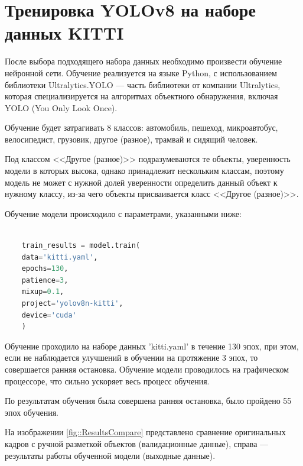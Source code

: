 \chapter {Тренировка YOLOv8 на наборе данных KITTI}

После выбора подходящего набора данных необходимо произвести обучение нейронной 
сети. Обучение реализуется на языке Python, с использованием библиотеки 
Ultralytics.YOLO --- часть библиотеки от компании Ultralytics, которая 
специализируется на алгоритмах объектного обнаружения, включая YOLO (You Only 
Look Once).

Обучение будет затрагивать 8 классов: автомобиль, пешеход, микроавтобус, 
велосипедист, грузовик, другое (разное), трамвай и сидящий человек.

Под классом <<Другое (разное)>> подразумеваются те объекты, уверенность модели
в которых высока, однако принадлежит нескольким классам, поэтому модель не может
с нужной долей уверенности определить данный объект к нужному классу, из-за чего 
объекты присваивается класс <<Другое (разное)>>.

Обучение модели происходило с параметрами, указанными ниже:

\begin{lstlisting}[language=Python]

	train_results = model.train(
    data='kitti.yaml', 
    epochs=130,
    patience=3,
    mixup=0.1,
    project='yolov8n-kitti',
    device='cuda'
	)

\end{lstlisting}

Обучение проходило на наборе данных 'kitti.yaml' в течение 130 эпох, при этом, если
не наблюдается улучшений в обучении на протяжение 3 эпох, то совершается ранняя 
остановка. Обучение модели проводилось на графическом процессоре, что сильно ускоряет
весь процесс обучения. 

По результатам обучения была совершена ранняя остановка, было пройдено 55 эпох обучения.

На изображении \ref{fig::ResultsCompare} представлено сравнение оригинальных кадров с 
ручной разметкой объектов (валидационные данные), справа — результаты работы обученной 
модели (выходные данные).


